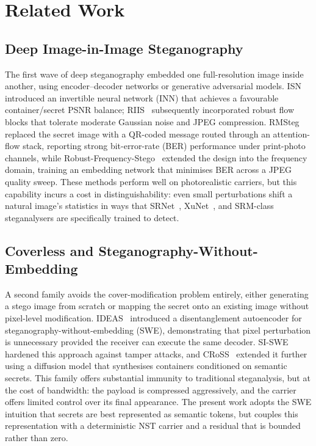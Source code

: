 \documentclass[conference]{IEEEtran}
\begin{document}
\section{Related Work}

\subsection{Deep Image-in-Image Steganography}
The first wave of deep steganography embedded one full-resolution image inside another, using encoder--decoder networks or generative adversarial models. ISN~\cite{isn} introduced an invertible neural network (INN) that achieves a favourable container/secret PSNR balance; RIIS~\cite{riis} subsequently incorporated robust flow blocks that tolerate moderate Gaussian noise and JPEG compression. RMSteg~\cite{rmsteg} replaced the secret image with a QR-coded message routed through an attention-flow stack, reporting strong bit-error-rate (BER) performance under print-photo channels, while Robust-Frequency-Stego~\cite{rfs2023} extended the design into the frequency domain, training an embedding network that minimises BER across a JPEG quality sweep. These methods perform well on photorealistic carriers, but this capability incurs a cost in distinguishability: even small perturbations shift a natural image's statistics in ways that SRNet~\cite{srnet}, XuNet~\cite{xunet}, and SRM-class~\cite{srm} steganalysers are specifically trained to detect.

\subsection{Coverless and Steganography-Without-Embedding}
A second family avoids the cover-modification problem entirely, either generating a stego image from scratch or mapping the secret onto an existing image without pixel-level modification. IDEAS~\cite{ideas2022} introduced a disentanglement autoencoder for steganography-without-embedding (SWE), demonstrating that pixel perturbation is unnecessary provided the receiver can execute the same decoder. SI-SWE~\cite{siswe2023} hardened this approach against tamper attacks, and CRoSS~\cite{cross} extended it further using a diffusion model that synthesises containers conditioned on semantic secrets. This family offers substantial immunity to traditional steganalysis, but at the cost of bandwidth: the payload is compressed aggressively, and the carrier offers limited control over its final appearance. The present work adopts the SWE intuition that secrets are best represented as semantic tokens, but couples this representation with a deterministic NST carrier and a residual that is bounded rather than zero.
\end{document}
